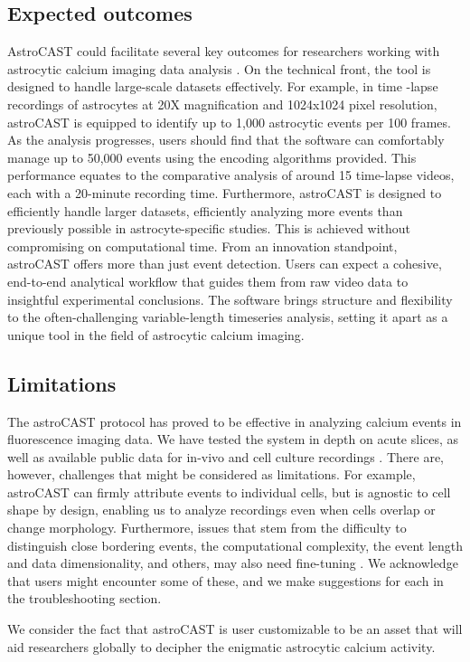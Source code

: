 
\subsection{Expected outcomes}

AstroCAST could facilitate several key outcomes for researchers working with astrocytic calcium imaging data analysis
. On the technical front, the tool is designed to handle large-scale datasets effectively. For example, in time
-lapse recordings of astrocytes at 20X magnification and 1024x1024 pixel resolution, astroCAST is equipped to
identify up to 1,000 astrocytic events per 100 frames. As the analysis progresses, users should find that the
software can comfortably manage up to 50,000 events using the encoding algorithms provided. This performance equates
to the comparative analysis of around 15 time-lapse videos, each with a 20-minute recording time. Furthermore,
astroCAST is designed to efficiently handle larger datasets, efficiently analyzing more events than previously
possible in astrocyte-specific studies. This is achieved without compromising on computational time. From an
innovation standpoint, astroCAST offers more than just event detection. Users can expect a cohesive, end-to-end
analytical workflow that guides them from raw video data to insightful experimental conclusions. The software brings
structure and flexibility to the often-challenging variable-length timeseries analysis, setting it apart as a unique
tool in the field of astrocytic calcium imaging.

\subsection{Limitations}

The astroCAST protocol has proved to be effective in analyzing calcium events in fluorescence imaging data. We have
tested the system in depth on acute slices, as well as available public data for in-vivo and cell culture recordings
. There are, however, challenges that might be considered as limitations. For example, astroCAST can firmly attribute
events to individual cells, but is agnostic to cell shape by design, enabling us to analyze recordings even when
cells overlap or change morphology. Furthermore, issues that stem from the difficulty to distinguish close bordering
events, the computational complexity, the event length and data dimensionality, and others, may also need fine-tuning
. We acknowledge that users might encounter some of these, and we make suggestions for each in the troubleshooting
section.

We consider the fact that astroCAST is user customizable to be an asset that will aid researchers globally to
decipher the enigmatic astrocytic calcium activity.